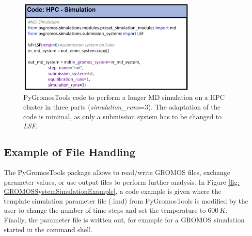 \begin{figure}[h]
    \centering
    \includegraphics[width=0.8\textwidth]{fig/ApplicationExamples/codeExample_GROMOSSystemHPCSimulation.png}
    \caption{PyGromosTools code to perform a longer MD simulation on a HPC cluster in three parts (\textit{simulation\_runs}=3). The adaptation of the code is minimal, as only a submission system has to be changed to \textit{LSF}.}
    \label{fig: GROMOSSystemSimulationHPCExample}
\end{figure}


\subsection{Example of File Handling}
The PyGromosTools package allows to read/write GROMOS files, exchange parameter values, or use output files to perform further analysis. In Figure \ref{fig: GROMOSSystemSimulationExample}, a code example is given where the template simulation parameter file (.imd) from PyGromosTools is modified by the user to change the number of time steps and set the temperature to $600~K$. Finally, the parameter file is written out, for example for a GROMOS simulation started in the command shell. 

